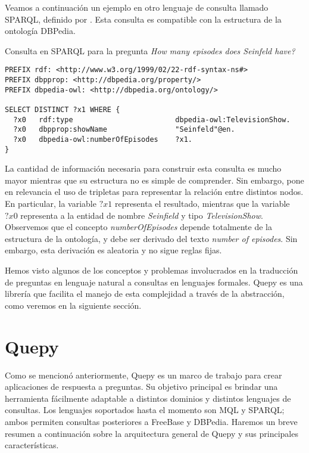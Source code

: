 Veamos a continuación un ejemplo en otro lenguaje de consulta llamado SPARQL, definido por \citet{sparql}. Esta consulta es compatible con la estructura de la ontología DBPedia.

\begin{example} Consulta en SPARQL para la pregunta \textit{How many episodes does Seinfeld have?}
\begin{lstlisting}
PREFIX rdf: <http://www.w3.org/1999/02/22-rdf-syntax-ns#>
PREFIX dbpprop: <http://dbpedia.org/property/>
PREFIX dbpedia-owl: <http://dbpedia.org/ontology/>

SELECT DISTINCT ?x1 WHERE {
  ?x0   rdf:type                        dbpedia-owl:TelevisionShow.
  ?x0   dbpprop:showName                "Seinfeld"@en.
  ?x0   dbpedia-owl:numberOfEpisodes    ?x1.
}
\end{lstlisting}
\end{example}

La cantidad de información necesaria para construir esta consulta es mucho mayor mientras que su estructura no es simple de comprender. Sin embargo, pone en relevancia el uso de tripletas para representar la relación entre distintos nodos. En particular, la variable $?x1$ representa el resultado, mientras que la variable $?x0$ representa a la entidad de nombre \textit{Seinfield} y tipo \textit{TelevisionShow}. Observemos que el concepto \textit{numberOfEpisodes} depende totalmente de la estructura de la ontología, y debe ser derivado del texto \textit{number of episodes}. Sin embargo, esta derivación es aleatoria y no sigue reglas fijas.

Hemos visto algunos de los conceptos y problemas involucrados en la traducción de preguntas en lenguaje natural a consultas en lenguajes formales. Quepy es una librería que facilita el manejo de esta complejidad a través de la abstracción, como veremos en la siguiente sección.


\section{Quepy}

Como se mencionó anteriormente, Quepy es un marco de trabajo para crear aplicaciones de respuesta a preguntas. Su objetivo principal es brindar una herramienta fácilmente adaptable a distintos dominios y distintos lenguajes de consultas. Los lenguajes soportados hasta el momento son MQL y SPARQL; ambos permiten consultas posteriores a FreeBase y DBPedia. Haremos un breve resumen a continuación sobre la arquitectura general de Quepy y sus principales características.

